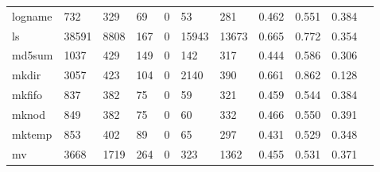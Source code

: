 \begin{longtable}{lp{1.10cm}p{1.10cm}p{1.10cm}p{1.10cm}p{1.10cm}p{1.10cm}p{1.10cm}p{1.10cm}p{1.10cm}p{1.10cm}}
logname   &                    732 &                                329 &                                69 &                                0 &                                53 &                             281 &                          0.462 &                                 0.551 &                               0.384 \\
ls        &                  38591 &                               8808 &                               167 &                                0 &                             15943 &                           13673 &                          0.665 &                                 0.772 &                               0.354 \\
md5sum    &                   1037 &                                429 &                               149 &                                0 &                               142 &                             317 &                          0.444 &                                 0.586 &                               0.306 \\
mkdir     &                   3057 &                                423 &                               104 &                                0 &                              2140 &                             390 &                          0.661 &                                 0.862 &                               0.128 \\
mkfifo    &                    837 &                                382 &                                75 &                                0 &                                59 &                             321 &                          0.459 &                                 0.544 &                               0.384 \\
mknod     &                    849 &                                382 &                                75 &                                0 &                                60 &                             332 &                          0.466 &                                 0.550 &                               0.391 \\
mktemp    &                    853 &                                402 &                                89 &                                0 &                                65 &                             297 &                          0.431 &                                 0.529 &                               0.348 \\
mv        &                   3668 &                               1719 &                               264 &                                0 &                               323 &                            1362 &                          0.455 &                                 0.531 &                               0.371 \\

\end{longtable}
